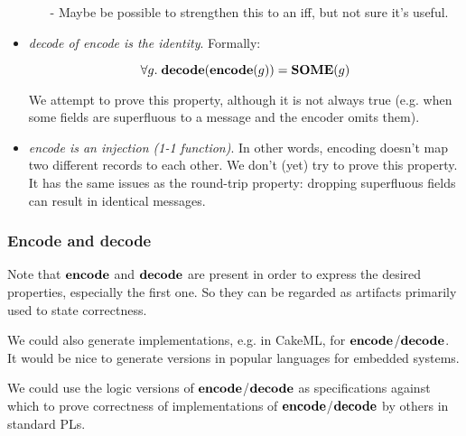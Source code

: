\documentclass{beamer}
\newcommand{\konst}[1]{\ensuremath{\mbox{\bf{#1}}}}
\begin{document}
\begin{frame}[allowframebreaks]
\begin{itemize}
\begin{itemize}
\vspace*{3mm}

\item[-] Maybe be possible to strengthen this to an iff, but not sure it's useful.

\end{itemize}

\framebreak

\item \textit{decode of encode is the identity}. Formally:

\[ \forall g.\; \konst{decode}(\konst{encode}(g)) = \konst{SOME}(g) \]

We attempt to prove this property, although it is not always true
(e.g. when some fields are superfluous to a message and the encoder
 omits them).

\item \textit{encode is an injection (1-1 function)}. In other words, encoding
  doesn't map two different records to each other.  We don't (yet) try
  to prove this property. It has the same issues as the round-trip
  property: dropping superfluous fields can result in identical messages.

\end{itemize}

\end{frame}

\begin{frame}\frametitle{Encode and decode}
  
Note that \konst{encode} and \konst{decode} are present in order to
express the desired properties, especially the first one. So they can
be regarded as artifacts primarily used to state correctness.

\vspace*{10mm}

We could also generate implementations, e.g. in CakeML, for
\konst{encode}/\konst{decode}.  It would be nice to generate versions
in popular languages for embedded systems.

\vspace*{10mm}

We could use the logic versions of \konst{encode}/\konst{decode} as
specifications against which to prove correctness of implementations
of \konst{encode}/\konst{decode} by others in standard PLs.

\end{frame}
\end{document}
